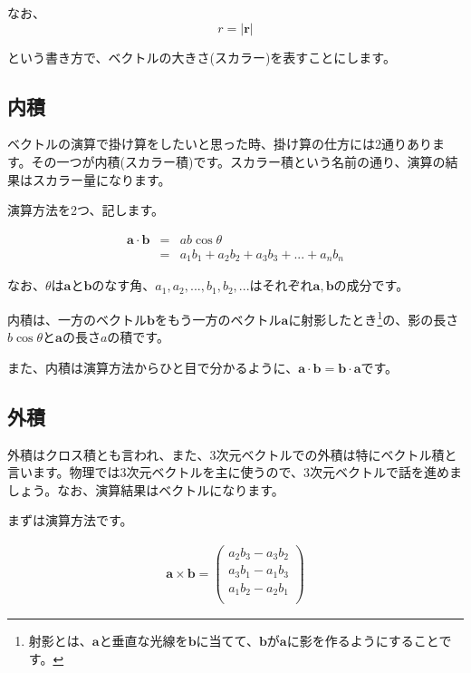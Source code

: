 なお、
\begin{equation}
    r = |\bm{r}|
\end{equation}

という書き方で、ベクトルの大きさ(スカラー)を表すことにします。



\subsection{内積}
ベクトルの演算で掛け算をしたいと思った時、掛け算の仕方には2通りあります。その一つが内積(スカラー積)です。スカラー積という名前の通り、演算の結果はスカラー量になります。

演算方法を2つ、記します。

\begin{eqnarray}
    \bm{a}\cdot\bm{b} &=& ab\cos\theta \\
    &=& a_1b_1+a_2b_2+a_3b_3+ ... + a_nb_n
\end{eqnarray}

なお、$\theta$は$\bm{a}$と$\bm{b}$のなす角、$a_1,a_2,...,b_1,b_2,...$はそれぞれ$\bm{a},\bm{b}$の成分です。

内積は、一方のベクトル$\bm{b}$をもう一方のベクトル$\bm{a}$に射影したとき\footnote{射影とは、$\bm{a}$と垂直な光線を$\bm{b}$に当てて、$\bm{b}$が$\bm{a}$に影を作るようにすることです。}の、影の長さ$b\cos\theta$と$\bm{a}$の長さ$a$の積です。

また、内積は演算方法からひと目で分かるように、$\bm{a}\cdot\bm{b}=\bm{b}\cdot\bm{a}$です。




\subsection{外積}
外積はクロス積とも言われ、また、3次元ベクトルでの外積は特にベクトル積と言います。物理では3次元ベクトルを主に使うので、3次元ベクトルで話を進めましょう。なお、演算結果はベクトルになります。

まずは演算方法です。

\begin{eqnarray}
    \bm{a}\times\bm{b}=
    \begin{pmatrix}
    a_2b_3-a_3b_2 \\
    a_3b_1-a_1b_3 \\
    a_1b_2-a_2b_1 \\
    \end{pmatrix}
\end{eqnarray}


